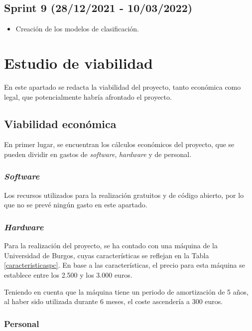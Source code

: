\subsection{Sprint 9 (28/12/2021 - 10/03/2022)}

\begin{itemize}
\item Creación de los modelos de clasificación.
\end{itemize}

\section{Estudio de viabilidad}

En este apartado se redacta la viabilidad del proyecto, tanto económica como legal, que potencialmente habría afrontado el proyecto.

\subsection{Viabilidad económica}

En primer lugar, se encuentran los cálculos económicos del proyecto, que se pueden dividir en gastos de \textit{software}, \textit{hardware} y de personal.

\subsubsection{\textit{Software}}

Los recursos utilizados para la realización gratuitos y de código abierto, por lo que no se prevé ningún gasto en este apartado.

\subsubsection{\textit{Hardware}}

Para la realización del proyecto, se ha contado con una máquina de la Universidad de Burgos, cuyas características se reflejan en la Tabla \ref{caracteristicaspc}.
En base a las características, el precio para esta máquina se establece entre los 2.500 y los 3.000 euros.

Teniendo en cuenta que la máquina tiene un periodo de amortización de 5 años, al haber sido utilizada durante 6 meses, el coste ascendería a 300 euros.

\subsubsection{Personal}

